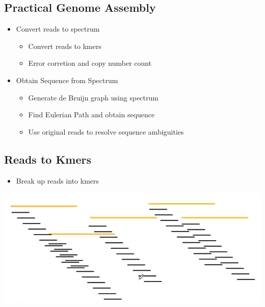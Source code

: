 \documentclass[10pt]{article}
\begin{document}
\subsection*{Practical Genome Assembly}
\begin{itemize}
    \item Convert reads to spectrum
    \begin{itemize}
        \item Convert reads to kmers
        \item Error corretion and copy number count
    \end{itemize}
    \item Obtain Sequence from Spectrum
    \begin{itemize}
        \item Generate de Bruijn graph using spectrum
        \item Find Eulerian Path and obtain sequence
        \item Use original reads to resolve sequence ambiguities
    \end{itemize}    
\end{itemize}

\subsection*{Reads to Kmers}
\begin{itemize}
    \item Break up reads into kmers
\end{itemize}
\begin{center}
    \includegraphics*[scale=0.8]{W4_19.png}
\end{center}
\end{document}
